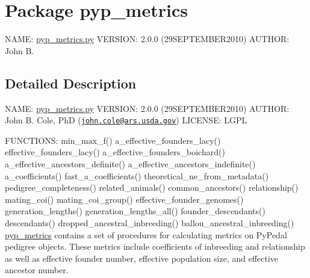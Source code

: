 \hypertarget{namespacepyp__metrics}{
\section{Package pyp\_\-metrics}
\label{namespacepyp__metrics}
}


NAME: \hyperlink{pyp__metrics_8py_source}{pyp\_\-metrics.py} VERSION: 2.0.0 (29SEPTEMBER2010) AUTHOR: John B.  




\subsection{Detailed Description}
NAME: \hyperlink{pyp__metrics_8py_source}{pyp\_\-metrics.py} VERSION: 2.0.0 (29SEPTEMBER2010) AUTHOR: John B. Cole, PhD (\href{mailto:john.cole@ars.usda.gov}{\tt john.cole@ars.usda.gov}) LICENSE: LGPL

FUNCTIONS: min\_\-max\_\-f() a\_\-effective\_\-founders\_\-lacy() effective\_\-founders\_\-lacy() a\_\-effective\_\-founders\_\-boichard() a\_\-effective\_\-ancestors\_\-definite() a\_\-effective\_\-ancestors\_\-indefinite() a\_\-coefficients() fast\_\-a\_\-coefficients() theoretical\_\-ne\_\-from\_\-metadata() pedigree\_\-completeness() related\_\-animals() common\_\-ancestors() relationship() mating\_\-coi() mating\_\-coi\_\-group() effective\_\-founder\_\-genomes() generation\_\-lengths() generation\_\-lengths\_\-all() founder\_\-descendants() descendants() dropped\_\-ancestral\_\-inbreeding() ballou\_\-ancestral\_\-inbreeding() \hyperlink{namespacepyp__metrics}{pyp\_\-metrics} contains a set of procedures for calculating metrics on PyPedal pedigree objects. These metrics include coefficients of inbreeding and relationship as well as effective founder number, effective population size, and effective ancestor number. 